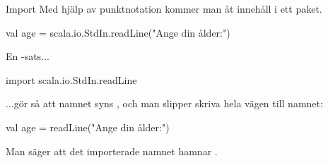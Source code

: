 \begin{Slide}{Import}
Med hjälp av punktnotation kommer man åt innehåll i ett paket.\\
\begin{Code}
val age = scala.io.StdIn.readLine("Ange din ålder:")
\end{Code}

En -sats...

\begin{Code}
import scala.io.StdIn.readLine
\end{Code}

...gör så att namnet syns , och man slipper skriva hela vägen till namnet:
\begin{Code}
val age = readLine("Ange din ålder:")
\end{Code}

Man säger att det importerade namnet hamnar .
\end{Slide}


